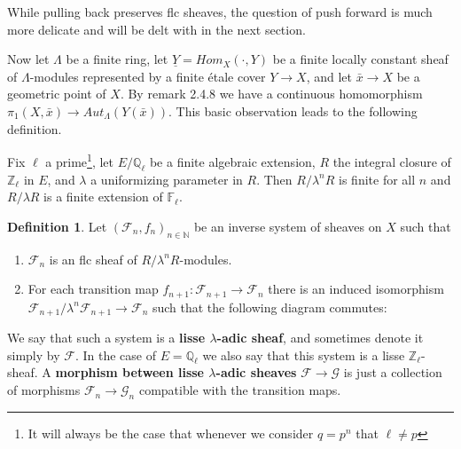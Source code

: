 \documentclass{ucbthesis}
\theoremstyle{definition}
\newtheorem{defn}[thm]{Definition}
\theoremstyle{theorem}
\begin{document}
While pulling back preserves flc sheaves, the question of push forward is much more delicate and will be delt with in the next section.

Now let $\Lambda$ be a finite ring, let $\underline{Y} = Hom_{X}(\cdot,Y)$ be a finite locally constant sheaf of $\Lambda$-modules represented by a finite \'{e}tale cover $Y \rightarrow X$, and let $\bar{x}\rightarrow X$ be a geometric point of $X$. By remark 2.4.8 we have a continuous homomorphism $\pi_{1}(X,\bar{x}) \rightarrow Aut_{\Lambda}(Y(\bar{x}))$. This basic observation leads to the following definition.

Fix $\ell$ a prime\footnote{It will always be the case that whenever we consider $q=p^{n}$ that $\ell\neq p$}, let $E/\mathbb{Q}_{\ell}$ be a finite algebraic extension, $R$ the integral closure of $\mathbb{Z}_{\ell}$ in $E$, and $\lambda$ a uniformizing parameter in $R$. Then $R/{\lambda}^{n}R$ is finite for all $n$ and $R/\lambda R$ is a finite extension of $\mathbb{F}_{\ell}$. 

\begin{defn}
Let $(\mathcal{F}_{n},f_{n})_{n\in{\mathbb{N}}}$ be an inverse system of sheaves on $X$ such that 
\begin{enumerate}
\item $\mathcal{F}_{n}$ is an flc sheaf of $R/\lambda^{n}R$-modules.
\item For each transition map $f_{n+1}:\mathcal{F}_{n+1}\rightarrow \mathcal{F}_{n}$ there is an induced isomorphism $\mathcal{F}_{n+1}/{\lambda}^{n}\mathcal{F}_{n+1} \rightarrow \mathcal{F}_{n}$ such that the following diagram commutes:
\begin{center}
\end{center}
\end{enumerate}
We say that such a system is a \textbf{lisse $\lambda$-adic sheaf}, and sometimes denote it simply by $\mathcal{F}$. In the case of $E=\mathbb{Q}_{\ell}$ we also say that this system is a lisse $\mathbb{Z}_{\ell}$-sheaf. A \textbf{morphism between lisse $\lambda$-adic sheaves} $\mathcal{F} \rightarrow \mathcal{G}$ is just a collection of morphisms $\mathcal{F}_{n}\rightarrow \mathcal{G}_{n}$ compatible with the transition maps.  
\end{defn}
\end{document}
